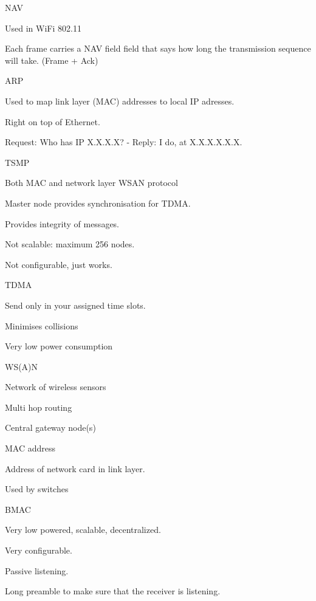 \documentclass[main.tex]{subfiles}
\begin{document}
\begin{card}{NAV}
\item Used in WiFi 802.11
\item Each frame carries a NAV field field that says how long the transmission sequence will take. (Frame + Ack)
\end{card}

\begin{card}{ARP}
\item Used to map link layer (MAC) addresses to local IP adresses.
\item Right on top of Ethernet.
\item Request: Who has IP X.X.X.X? - Reply: I do, at X.X.X.X.X.X.
\end{card}

\begin{card}{TSMP}
\item Both MAC and network layer WSAN protocol
\item Master node provides synchronisation for TDMA.
\item Provides integrity of messages.
\item Not scalable: maximum 256 nodes.
\item Not configurable, just works.
\end{card}

\begin{card}{TDMA}
\item Send only in your assigned time slots.
\item Minimises collisions
\item Very low power consumption
\end{card}

\begin{card}{WS(A)N}
\item Network of wireless sensors
\item Multi hop routing
\item Central gateway node(s)
\end{card}

\begin{card}{MAC address}
\item Address of network card in link layer.
\item Used by switches
\end{card}

\begin{card}{BMAC}
\item Very low powered, scalable, decentralized.
\item Very configurable.
\item Passive listening.
\item Long preamble to make sure that the receiver is listening.
\end{card}
\end{document}
